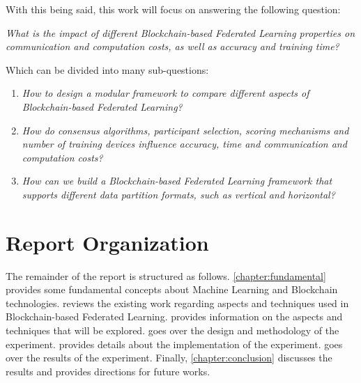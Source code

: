 With this being said, this work will focus on answering the following question:

\begin{center}
    \textit{What is the impact of different Blockchain-based Federated Learning properties on communication and computation costs, as well as accuracy and training time?}
\end{center}

Which can be divided into many sub-questions:

\begin{enumerate}
    \item \textit{How to design a modular framework to compare different aspects of Blockchain-based Federated Learning?}
    
    \item \textit{How do consensus algorithms, participant selection, scoring mechanisms and number of training devices influence accuracy, time and communication and computation costs?}
    
    \item \textit{How can we build a Blockchain-based Federated Learning framework that supports different data partition formats, such as vertical and horizontal?}
\end{enumerate}

\section{Report Organization}

The remainder of the report is structured as follows. \cref{chapter:fundamental} provides some fundamental concepts about Machine Learning and Blockchain technologies.  reviews the existing work regarding aspects and techniques used in Blockchain-based Federated Learning.  provides information on the aspects and techniques that will be explored.  goes over the design and methodology of the experiment.  provides details about the implementation of the experiment.  goes over the results of the experiment. Finally, \cref{chapter:conclusion} discusses the results and provides directions for future works.

